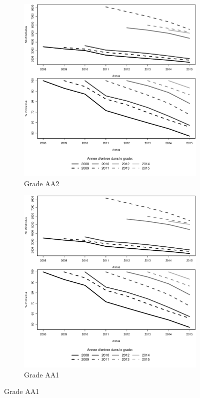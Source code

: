\documentclass[11pt,a4paper]{article}
\begin{document}
\begin{figure}[ht] 
  \caption{Survie dans le grade: Adjoints administratifs}
  \label{echelon_by_neg} 
  \begin{subfigure}[b]{0.55\linewidth}
      \caption{Grade AA2} 
    \label{echelon_by_neg_0} 
    \centering
    \includegraphics[width=1\linewidth]{survival_AA_1.pdf} 
    \vspace{4ex}
  \end{subfigure}
  \begin{subfigure}[b]{0.55\linewidth}
        \caption{Grade AA1} 
    \label{echelon_by_neg_1} 
    \centering
    \includegraphics[width=1\linewidth]{survival_AA_2.pdf} 
    \vspace{4ex}
  \end{subfigure} 
\end{figure}
\end{document}
